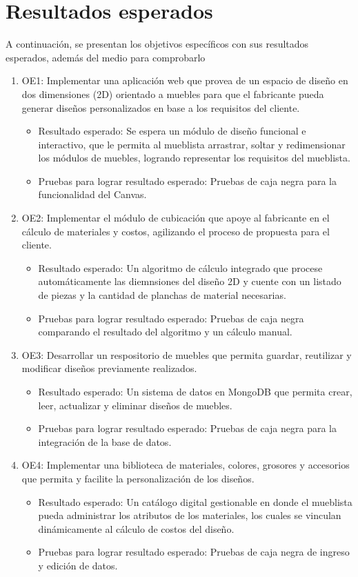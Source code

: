 ﻿\documentclass{iccmemoria}
\begin{document}
\section{Resultados esperados}
A continuación, se presentan los objetivos específicos con sus resultados esperados, además del medio para comprobarlo
\begin{enumerate}
\item OE1: Implementar una aplicación web que provea de un espacio de diseño en dos dimensiones (2D) orientado a muebles para que el fabricante pueda generar diseños personalizados en base a los requisitos del cliente.
\begin{itemize}
    \item Resultado esperado: Se espera un módulo de diseño funcional e interactivo, que le permita al mueblista arrastrar, soltar y redimensionar los módulos de muebles, logrando representar los requisitos del mueblista.
    \item Pruebas para lograr resultado esperado: Pruebas de caja negra para la funcionalidad del Canvas.
\end{itemize}

\item OE2: Implementar el módulo de cubicación que apoye al fabricante en el cálculo de materiales y costos, agilizando el proceso de propuesta para el cliente. 
\begin{itemize}
    \item Resultado esperado: Un algoritmo de cálculo integrado que procese automáticamente las diemnsiones del diseño 2D y cuente con un listado de piezas y la cantidad de planchas de material necesarias.
    \item Pruebas para lograr resultado esperado: Pruebas de caja negra comparando el resultado del algoritmo y un cálculo manual.
\end{itemize}

\item OE3: Desarrollar un respositorio de muebles que permita guardar, reutilizar y modificar diseños previamente realizados.
\begin{itemize}
    \item Resultado esperado: Un sistema de datos en MongoDB que permita crear, leer, actualizar y eliminar diseños de muebles.
    \item Pruebas para lograr resultado esperado: Pruebas de caja negra para la integración de la base de datos.
\end{itemize}

\item OE4: Implementar una biblioteca de materiales, colores, grosores y accesorios que permita y facilite la personalización de los diseños.
\begin{itemize}
    \item Resultado esperado: Un catálogo digital gestionable en donde el mueblista pueda administrar los atributos de los materiales, los cuales se vinculan dinámicamente al cálculo de costos del diseño.
    \item Pruebas para lograr resultado esperado: Pruebas de caja negra de ingreso y edición de datos.
\end{itemize}


\end{enumerate}
\end{document}
